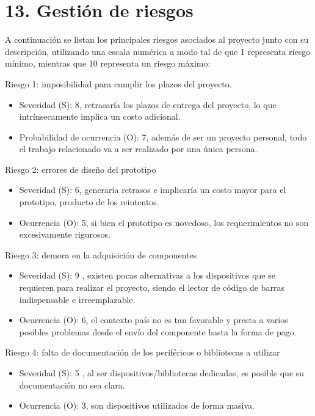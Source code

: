 \documentclass[
11pt, %
codirector, %
]{charter}
\begin{document}
\section{13. Gestión de riesgos}
\label{sec:riesgos}

A continuación se listan los principales riesgos asociados al proyecto junto con su descripción,  utilizando una escala numérica a modo tal de que 1 representa riesgo mínimo, mientras que 10 representa un riesgo máximo:
 
Riesgo 1: imposibilidad para cumplir los plazos del proyecto.
\begin{itemize}
	\item Severidad (S): 8, retrasaría los plazos de entrega del proyecto, lo que intrínsecamente implica un costo adicional.\\
	\item Probabilidad de ocurrencia (O): 7, además de ser un proyecto personal, todo el trabajo relacionado va a ser realizado por una única persona.\\
\end{itemize}   

Riesgo 2: errores de diseño del prototipo
\begin{itemize}
	\item Severidad (S): 6, generaría retrasos e implicaría un costo mayor para el prototipo, producto de los reintentos.
	\item Ocurrencia (O): 5, si bien el prototipo es novedoso, los requerimientos no son excesivamente rigurosos.
\end{itemize}

Riesgo 3: demora en la adquisición de componentes
\begin{itemize}
	\item Severidad (S): 9 , existen pocas alternativas a los dispositivos que se requieren para realizar el proyecto, siendo el lector de código de barras indispensable e irreemplazable.
	\item Ocurrencia (O): 6, el contexto país no es tan favorable y presta a varios posibles problemas desde el envío del componente hasta la forma de pago.
\end{itemize}

Riesgo 4: falta de documentación de los periféricos o bibliotecas a utilizar
\begin{itemize}
	\item Severidad (S): 5 , al ser dispositivos/bibliotecas dedicadas, es posible que su documentación no sea clara.
	\item Ocurrencia (O): 3, son dispositivos utilizados de forma masiva.
\end{itemize}
\end{document}

